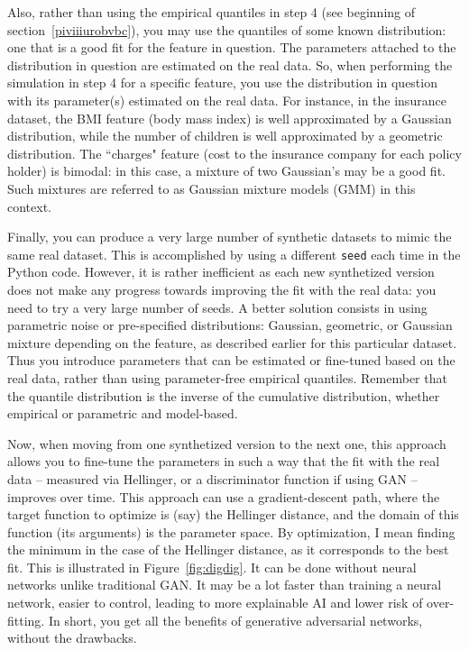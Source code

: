 \documentclass[oneside,10pt]{book}
\begin{document}
Also, rather than using the empirical quantiles in step 4 (see beginning of section~\ref{piviiiurobvbc}), you may use the quantiles of some known distribution: one that is a good fit for the feature in question. The parameters attached to the distribution in question are estimated on the real data. So, when performing the simulation in step 4 for a specific feature, you use the distribution in question with its parameter(s) estimated on the real data. For instance, in the insurance dataset, the BMI feature (body mass index) is well approximated by a Gaussian distribution, while the number of children is
 well approximated by a geometric distribution. The ``charges" feature (cost to the insurance company for each policy holder) is bimodal:  
in this case, a mixture of two Gaussian's may be a good fit. Such mixtures are referred to as 
\textcolor{index}{Gaussian mixture models} (GMM) in this context.

Finally, you can produce a very large number of synthetic datasets to mimic the same real dataset. This is accomplished by using a different \texttt{seed} each time in the Python code. However, it is rather inefficient as each new synthetized version
 does not make any progress towards improving the fit with the real data: you need to try a very large number of seeds.  A better solution consists in using parametric noise or pre-specified distributions: Gaussian, geometric, or Gaussian mixture depending on the feature, as described earlier for this particular dataset. Thus you introduce parameters that can be estimated or fine-tuned based on the real data, rather than using parameter-free 
 empirical quantiles. Remember that the quantile distribution is the inverse of the cumulative distribution, whether empirical or parametric and model-based.  

Now, when moving from one synthetized version to the next one, this approach allows you to fine-tune the parameters in such a way that the fit with the real data -- measured via Hellinger, or a discriminator function if using GAN -- improves over time. This approach can use a gradient-descent path,
 where the target function to optimize is (say) the Hellinger distance, and the domain of this function (its arguments) is the parameter space.
 By optimization, I mean finding the minimum in the case of the Hellinger distance, as it corresponds to the best fit.
This is illustrated in Figure~\ref{fig:digdig}. It can be done without neural networks unlike traditional GAN. It may be a lot faster than
 training a neural network, easier to control, leading to more explainable AI and lower risk of over-fitting.
 In short, you get all the benefits of \textcolor{index}{generative adversarial networks}, without the drawbacks.
\end{document}
